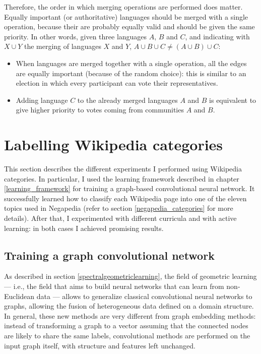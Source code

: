             Therefore, the order in which merging operations are performed does matter. Equally important (or authoritative) languages should be merged with a single operation, because their  are probably equally valid and should be given the same priority. In other words, given three languages \(A\), \(B\) and \(C\), and indicating with \(X \cup Y\) the merging of languages \(X\) and \(Y\), \(A \cup B \cup C \ne \left(A \cup B\right) \cup C\):
            \begin{itemize}
                \item When languages are merged together with a single operation, all the edges are equally important (because of the random choice): this is similar to an election in which every participant can vote their representatives.
                \item Adding language \(C\) to the already merged languages \(A\) and \(B\) is equivalent to give higher priority to votes coming from communities \(A\) and \(B\).
            \end{itemize}
    \section{Labelling Wikipedia categories}
        This section describes the different experiments I performed using Wikipedia categories. In particular, I used the learning framework described in chapter \ref{learning_framework} for training a graph-based convolutional neural network. It successfully learned how to classify each Wikipedia page into one of the eleven topics used in Negapedia (refer to section \ref{negapedia_categories} for more details). After that, I experimented with different curricula and with active learning: in both cases I achieved promising results.
        \subsection{Training a graph convolutional network}\label{experiments_gcn}
            As described in section \ref{spectralgeometriclearning}, the field of geometric learning --- i.e., the field that aims to build neural networks that can learn from non-Euclidean data --- allows to generalize classical convolutional neural networks to graphs, allowing the fusion of heterogeneous data defined on a domain structure. In general, these new methods are very different from graph embedding methods: instead of transforming a graph to a vector assuming that the connected nodes are likely to share the same labels, convolutional methods are performed on the input graph itself, with structure and features left unchanged.
            
